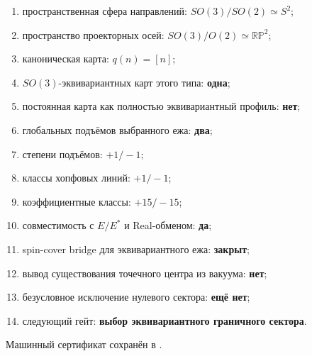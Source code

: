 \begin{protocol}
\begin{enumerate}
 \item пространственная сфера направлений:
 \textbf{$SO(3)/SO(2)\simeq S^2$};
 \item пространство проекторных осей:
 \textbf{$SO(3)/O(2)\simeq\mathbb{RP}^2$};
 \item каноническая карта: \textbf{$q(n)=[n]$};
 \item $SO(3)$-эквивариантных карт этого типа: \textbf{одна};
 \item постоянная карта как полностью эквивариантный профиль:
 \textbf{нет};
 \item глобальных подъёмов выбранного ежа: \textbf{два};
 \item степени подъёмов: \textbf{$+1/-1$};
 \item классы хопфовых линий: \textbf{$+1/-1$};
 \item коэффициентные классы: \textbf{$+15/-15$};
 \item совместимость с $E/E^*$ и Real-обменом: \textbf{да};
 \item spin-cover bridge для эквивариантного ежа: \textbf{закрыт};
 \item вывод существования точечного центра из вакуума: \textbf{нет};
 \item безусловное исключение нулевого сектора: \textbf{ещё нет};
 \item следующий гейт: \textbf{выбор эквивариантного граничного сектора}.
\end{enumerate}
\end{protocol}

Машинный сертификат сохранён в
.